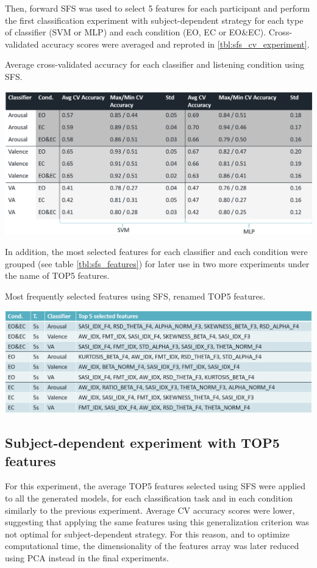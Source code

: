 \FloatBarrier
Then, forward \ac{SFS} was used to select 5 features for each participant  and perform the first  classification experiment with subject-dependent strategy for each type of classifier (\ac{SVM} or \ac{MLP}) and each condition (EO, EC or EO\&EC). Cross-validated accuracy scores were averaged and reproted in \ref{tbl:sfs_cv_experiment}.

\begin{table}[h!]
  \caption{Average cross-validated accuracy for each classifier and listening condition using SFS.}
  \label{tbl:sfs_cv_experiment}
  \includegraphics[width=\linewidth]{img/appendix/sfs_cv_experiment.png}
\end{table}

\FloatBarrier
In addition, the most selected features for each classifier and each condition were grouped (see table \ref{tbl:sfs_features}) for later use in two more experiments under the name of TOP5 features.

\begin{table}[h!]
  \caption{Most frequently selected features using SFS, renamed TOP5 features.}
  \label{tbl:sfs_features}
  \includegraphics[width=\linewidth]{img/appendix/sfs_features.png}
\end{table}
\FloatBarrier

\subsection{Subject-dependent experiment with TOP5 features}
\label{sec:appendix_A3.2}
For this experiment, the average TOP5 features selected using \ac{SFS} were applied to all the generated models, for each classification task and in each condition similarly to the previous experiment. Average CV accuracy scores were lower, suggesting that applying the same features using this generalization criterion was not optimal for subject-dependent strategy. For this reason, and to optimize computational time, the dimensionality of the features array was later reduced using \ac{PCA} instead in the final experiments.


